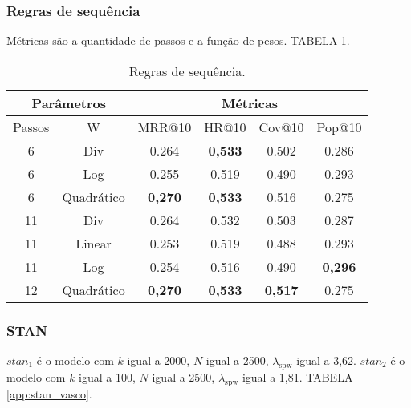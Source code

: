 \subsubsection{Regras de sequência}
Métricas são a quantidade de passos e a função de pesos. TABELA \ref{app:sr2}.
\begin{table}[htbp]
    \centering
    \begin{tabular}{|c|c|c|c|c|c|}
        \hline
        \multicolumn{2}{|c|}{Parâmetros} & \multicolumn{4}{c|}{Métricas} \\
        \hline
        Passos & W & MRR@10 & HR@10 & Cov@10 & Pop@10 \\
        \hline
        6 & Div & 0.264 & \textbf{0,533} & 0.502 & 0.286 \\
        \hline
        6 & Log & 0.255 & 0.519 & 0.490 & 0.293 \\
        \hline
        6 & Quadrático & \textbf{0,270} & \textbf{0,533} & 0.516 & 0.275 \\
        \hline
        11 & Div & 0.264 & 0.532 & 0.503 & 0.287 \\
        \hline
        11 & Linear & 0.253 & 0.519 & 0.488 & 0.293 \\
        \hline
        11 & Log & 0.254 & 0.516 & 0.490 & \textbf{0,296} \\
        \hline
        12 & Quadrático & \textbf{0,270} & \textbf{0,533} & \textbf{0,517} & 0.275 \\
        \hline
        \end{tabular}
    \caption{Regras de sequência.}
\label{app:sr2}
\end{table}


\subsubsection{STAN}
$stan_1$ é o modelo com $k$ igual a 2000, $N$ igual a 2500, $\lambda_{\text{spw}}$ igual a 3,62.
$stan_2$ é o modelo com $k$ igual a 100, $N$ igual a 2500, $\lambda_{\text{spw}}$ igual a 1,81.
TABELA \ref{app:stan_vasco}.

